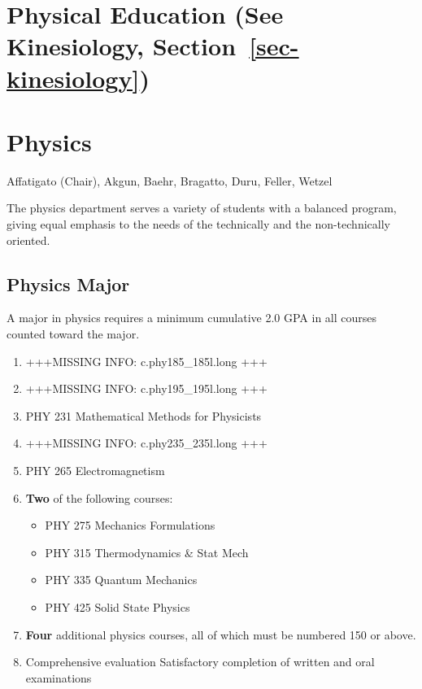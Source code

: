 \documentclass[
  letterpaper,
]{scrbook}
\providecommand{\tightlist}{%
  \setlength{\itemsep}{0pt}\setlength{\parskip}{0pt}}
\begin{document}
\section{\texorpdfstring{Physical Education (See Kinesiology,
Section~\ref{sec-kinesiology})}{Physical Education (See Kinesiology, Section~)}}\label{physical-education-see-kinesiology-sec-kinesiology}

\section{Physics}\label{physics}

Affatigato (Chair), Akgun, Baehr, Bragatto, Duru, Feller, Wetzel

The physics department serves a variety of students with a balanced
program, giving equal emphasis to the needs of the technically and the
non-technically oriented.

\subsection{Physics Major}\label{physics-major}

A major in physics requires a minimum cumulative 2.0 GPA in all courses
counted toward the major.

\begin{enumerate}
\def\labelenumi{\arabic{enumi}.}
\item
  +++MISSING INFO: c.phy185\_185l.long +++
\item
  +++MISSING INFO: c.phy195\_195l.long +++
\item
  PHY 231 Mathematical Methods for Physicists
\item
  +++MISSING INFO: c.phy235\_235l.long +++
\item
  PHY 265 Electromagnetism
\item
  \textbf{Two} of the following courses:

  \begin{itemize}
  \tightlist
  \item
    PHY 275 Mechanics Formulations
  \item
    PHY 315 Thermodynamics \& Stat Mech
  \item
    PHY 335 Quantum Mechanics
  \item
    PHY 425 Solid State Physics
  \end{itemize}
\item
  \textbf{Four} additional physics courses, all of which must be
  numbered 150 or above.
\item
  Comprehensive evaluation Satisfactory completion of written and oral
  examinations
\end{enumerate}
\end{document}
